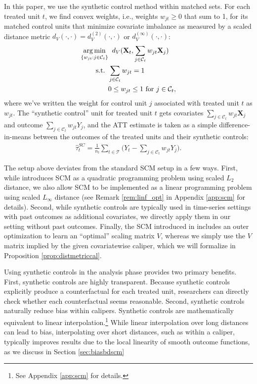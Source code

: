 \documentclass{article}
\newcommand{\Xt}{\mathbf{X}_t}
\newcommand{\Xj}{\mathbf{X}_j}
\newcommand{\Ct}{\mathcal{C}_{t}}
\DeclareMathOperator*{\argmin}{arg\,min}
\begin{document}
In this paper, we use the synthetic control method \citep[SCM; ][]{abadie2010synthetic} within matched sets.
For each treated unit $t$, we find convex weights, i.e., weights $w_{jt} \geq 0$ that sum to 1, for its matched control units that minimize covariate imbalance as measured by a scaled distance metric $d_V(\cdot, \cdot) = d_V^{(2)}(\cdot, \cdot)$ or $d_V^{(\infty)}(\cdot, \cdot)$:
\begin{align*}
    \argmin_{\{w_{jt} : j \in \Ct\}} 
        &\hspace{2mm} d_V(\Xt, \sum_{j \in \Ct}w_{jt} \Xj) \\
    \text{s.t. } 
        &\sum_{j \in \Ct} w_{jt} = 1 \\
        &0 \leq w_{jt} \leq 1 \text{ for } j \in \mathcal{C}_t,
\end{align*}
where we've written the weight for control unit $j$ associated with treated unit $t$ as $w_{jt}$.
The ``synthetic control'' unit for treated unit $t$ gets covariates $\sum_{j \in \Ct}w_{jt} \Xj$ and outcome $\sum_{j \in \Ct}w_{jt} Y_j$,
and the ATT estimate is taken as a simple difference-in-means between the outcomes of the treated units and their synthetic controls:
\begin{align*}
    \hat{\tau}_t^{SC} = \frac{1}{n_t} \sum_{t \in \mathcal{T}} \big(Y_t - \sum_{j \in \Ct} w_{jt} Y_j \big).
\end{align*}

The setup above deviates from the standard SCM setup in a few ways.
First, while \citet{abadie2010synthetic} introduces SCM as a quadratic programming problem using scaled $L_2$ distance, we also allow SCM to be implemented as a linear programming problem using scaled $L_\infty$ distance (see Remark \ref{rem:linf_opt} in Appendix \ref{app:scm} for details).
Second, while synthetic controls are typically used in time-series settings with past outcomes as additional covariates, we directly apply them in our setting without past outcomes.
Finally, the SCM introduced in \citet{abadie2010synthetic} includes an outer optimization to learn an ``optimal'' scaling matrix $V$, whereas we simply use the $V$ matrix implied by the given covariatewise caliper, which we will formalize in Proposition \ref{prop:distmetriccal}.

Using synthetic controls in the analysis phase provides two primary benefits.
First, synthetic controls are highly transparent.
Because synthetic controls explicitly produce a counterfactual for each treated unit, researchers can directly check whether each counterfactual seems reasonable.
Second, synthetic controls naturally reduce bias within calipers.
Synthetic controls are mathematically equivalent to linear interpolation.\footnote{See Appendix \ref{app:scm} for details.}
While linear interpolation over long distances can lead to bias, interpolating over short distances, such as within a caliper, typically improves results due to the local linearity of smooth outcome functions, as we discuss in Section \ref{sec:biasbdscm}
\end{document}
